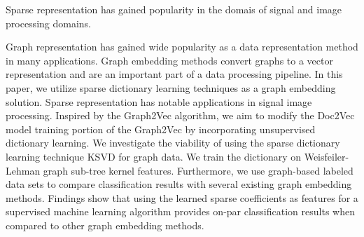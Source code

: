 Sparse representation has gained popularity in the domais of signal and image processing domains. 

Graph representation has gained wide popularity as a data representation method in many applications. Graph embedding methods convert graphs to a vector representation and are an important part of a data processing pipeline. In this paper, we utilize sparse dictionary learning techniques as a graph embedding solution. Sparse representation has notable applications in signal image processing. Inspired by the Graph2Vec algorithm, we aim to modify the Doc2Vec model training portion of the Graph2Vec by incorporating unsupervised dictionary learning. We investigate the viability of using the sparse dictionary learning technique KSVD for graph data. We train the dictionary on Weisfeiler-Lehman graph sub-tree kernel features. Furthermore, we use graph-based labeled data sets to compare classification results with several existing graph embedding methods. Findings show that using the learned sparse coefficients as features for a supervised machine learning algorithm provides on-par classification results when compared to other graph embedding methods. 